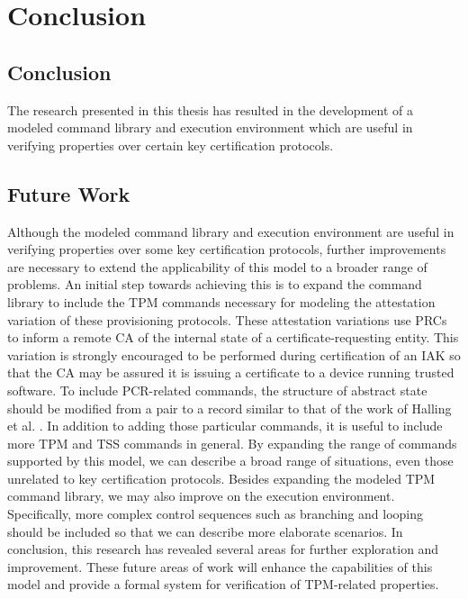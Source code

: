 \chapter{Conclusion}


\section{Conclusion}


The research presented in this thesis has resulted in the development of a modeled command library and execution environment which are useful in verifying properties over certain key certification protocols.


\section{Future Work}

Although the modeled command library and execution environment are useful in verifying properties over some key certification protocols, further improvements are necessary to extend the applicability of this model to a broader range of problems. An initial step towards achieving this is to expand the command library to include the TPM commands necessary for modeling the attestation variation of these provisioning protocols. These attestation variations use PRCs to inform a remote CA of the internal state of a certificate-requesting entity. This variation is strongly encouraged to be performed during certification of an IAK so that the CA may be assured it is issuing a certificate to a device running trusted software. To include PCR-related commands, the structure of abstract state should be modified from a pair to a record similar to that of the work of Halling et al. \cite{PrivacyCAAnalysis-Hall}. In addition to adding those particular commands, it is useful to include more TPM and TSS commands in general. By expanding the range of commands supported by this model, we can describe a broad range of situations, even those unrelated to key certification protocols.  Besides expanding the modeled TPM command library, we may also improve on the execution environment. Specifically, more complex control sequences such as branching and looping should be included so that we can describe more elaborate scenarios.  In conclusion, this research has revealed several areas for further exploration and improvement. These future areas of work will enhance the capabilities of this model and provide a formal system for verification of TPM-related properties.
